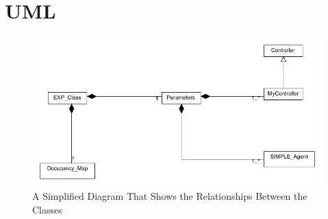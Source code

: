 \section{UML}
\label{appendixB:uml}

\begin{figure}[h]
\centering
\includegraphics[scale=0.6]{Chapter2/images/uml_simple.png}
\caption{A Simplified Diagram That Shows the Relationships Between the Classes}
\label{fig:simple_uml}
\end{figure}



